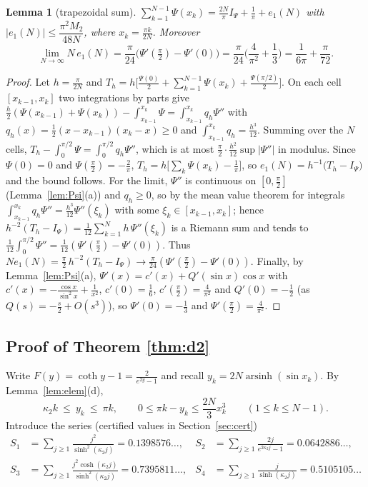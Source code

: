 \documentclass[11pt,a4paper]{article}
\theoremstyle{plain}
\newtheorem{lemma}[theorem]{Lemma}
\theoremstyle{definition}
\numberwithin{equation}{section}
\begin{document}
\begin{lemma}[trapezoidal sum]\label{lem:trap}
$\displaystyle\sum_{k=1}^{N-1}\Psi(x_k)=\frac{2N}{\pi}I_\Psi+\frac1\pi+e_1(N)$ with $|e_1(N)|\le\dfrac{\pi^2M_2}{48N}$, where $x_k=\frac{\pi k}{2N}$. Moreover
\begin{equation}\label{eq:e1limit}
\lim_{N\to\infty}N\,e_1(N)=\frac{\pi}{24}\Big(\Psi'(\tfrac\pi2)-\Psi'(0)\Big)=\frac{\pi}{24}\Big(\frac4{\pi^2}+\frac13\Big)=\frac1{6\pi}+\frac{\pi}{72}.
\end{equation}
\end{lemma}
\begin{proof}
Let $h=\frac\pi{2N}$ and $T_h=h\big[\frac{\Psi(0)}2+\sum_{k=1}^{N-1}\Psi(x_k)+\frac{\Psi(\pi/2)}2\big]$. On each cell $[x_{k-1},x_k]$ two integrations by parts give $\frac h2(\Psi(x_{k-1})+\Psi(x_k))-\int_{x_{k-1}}^{x_k}\Psi=\int_{x_{k-1}}^{x_k}q_h\Psi''$ with $q_h(x)=\frac12(x-x_{k-1})(x_k-x)\ge0$ and $\int_{x_{k-1}}^{x_k}q_h=\frac{h^3}{12}$. Summing over the $N$ cells, $T_h-\int_0^{\pi/2}\Psi=\int_0^{\pi/2}q_h\Psi''$, which is at most $\frac\pi2\cdot\frac{h^2}{12}\sup|\Psi''|$ in modulus. Since $\Psi(0)=0$ and $\Psi(\frac\pi2)=-\frac2\pi$, $T_h=h\big[\sum_k\Psi(x_k)-\frac1\pi\big]$, so $e_1(N)=h^{-1}\big(T_h-I_\Psi\big)$ and the bound follows. For the limit, $\Psi''$ is continuous on $[0,\frac\pi2]$ (Lemma~\ref{lem:Psi}(a)) and $q_h\ge0$, so by the mean value theorem for integrals $\int_{x_{k-1}}^{x_k}q_h\Psi''=\frac{h^3}{12}\Psi''(\xi_k)$ with some $\xi_k\in[x_{k-1},x_k]$; hence $h^{-2}(T_h-I_\Psi)=\frac1{12}\sum_{k=1}^{N}h\,\Psi''(\xi_k)$ is a Riemann sum and tends to $\frac1{12}\int_0^{\pi/2}\Psi''=\frac1{12}(\Psi'(\frac\pi2)-\Psi'(0))$. Thus $N e_1(N)=\frac\pi2\,h^{-2}(T_h-I_\Psi)\to\frac\pi{24}(\Psi'(\frac\pi2)-\Psi'(0))$. Finally, by Lemma~\ref{lem:Psi}(a), $\Psi'(x)=c'(x)+Q'(\sin x)\cos x$ with $c'(x)=-\frac{\cos x}{\sin^2x}+\frac1{x^2}$, $c'(0)=\frac16$, $c'(\frac\pi2)=\frac4{\pi^2}$ and $Q'(0)=-\frac12$ (as $Q(s)=-\frac s2+O(s^3)$), so $\Psi'(0)=-\frac13$ and $\Psi'(\frac\pi2)=\frac4{\pi^2}$.
\end{proof}

\subsection{Proof of Theorem \ref{thm:d2}}
Write $F(y)=\coth y-1=\frac{2}{e^{2y}-1}$ and recall $y_k=2N\operatorname{arsinh}(\sin x_k)$. By Lemma~\ref{lem:elem}(d),
\begin{equation}\label{eq:yk}
\kappa_2k\ \le\ y_k\ \le\ \pi k,\qquad 0\le\pi k-y_k\le\frac{2N}{3}x_k^3\qquad(1\le k\le N-1).
\end{equation}
Introduce the series (certified values in Section~\ref{sec:cert})
\[
\begin{aligned}S_1&=\sum_{j\ge1}\frac{j^2}{\sinh^2(\kappa_2j)}=0.1398576\ldots,& S_2&=\sum_{j\ge1}\frac{2j}{e^{2\kappa_2j}-1}=0.0642886\ldots,\\
S_3&=\sum_{j\ge1}\frac{j^2\cosh(\kappa_2j)}{\sinh^2(\kappa_2j)}=0.7395811\ldots,& S_4&=\sum_{j\ge1}\frac{j}{\sinh(\kappa_2j)}=0.5105105\ldots\end{aligned}
\]
\end{document}
